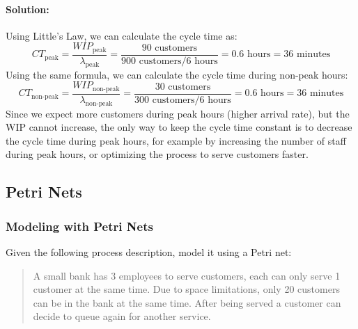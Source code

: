 \paragraph{Solution:}
Using Little's Law, we can calculate the cycle time as:
\begin{equation*}
    CT_{\text{peak}} = \frac{WIP_{\text{peak}}}{\lambda_{\text{peak}}} = \frac{90 \text{ customers}}{900 \text{ customers} / 6 \text{ hours}} = 0.6 \text{ hours} = 36 \text{ minutes}
\end{equation*}
Using the same formula, we can calculate the cycle time during non-peak hours:
\begin{equation*}
    CT_{\text{non-peak}} = \frac{WIP_{\text{non-peak}}}{\lambda_{\text{non-peak}}} = \frac{30 \text{ customers}}{300 \text{ customers} / 6 \text{ hours}} = 0.6 \text{ hours} = 36 \text{ minutes}
\end{equation*}
Since we expect more customers during peak hours (higher arrival rate), but the WIP cannot increase, the only way to keep the cycle time constant
is to decrease the cycle time during peak hours, for example by increasing the number of staff during peak hours, or optimizing the process to serve customers faster.

\subsection{Petri Nets}
\subsubsection{Modeling with Petri Nets}
Given the following process description, model it using a Petri net:
\begin{quote}
    A small bank has 3 employees to serve customers, each can only serve 1 customer at the same time.
    Due to space limitations, only 20 customers can be in the bank at the same time.
    After being served a customer can decide to queue again for
    another service.
\end{quote}
